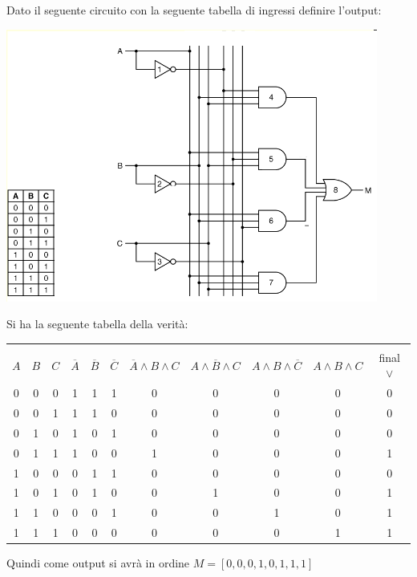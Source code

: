 \documentclass[a4paper,12pt, oneside]{book}
\begin{document}
\begin{esercizio}
Dato il seguente circuito con la seguente tabella di ingressi definire l'output:
\begin{center}
\includegraphics[scale=0.6]{img/es2.png}
\end{center}
Si ha la seguente tabella della verità:
\begin{center}
\begin{tabular}{|c|c|c|c|c|c|c|c|c|c|c|}
\hline 
& & & & & & & & & & \\
$A$ & $B$ & $C$ & $\overline{A}$ & $\overline{B}$ & $\overline{C}$ & $\overline{A}\wedge B\wedge C$  & $A\wedge \overline{B}\wedge C$ & $A\wedge B\wedge\overline{C}$ & $A\wedge B\wedge C$ & final $\vee$\\
\hline
0 & 0 & 0 & 1 & 1 & 1 & 0 & 0 & 0 & 0 & 0\\
\hline
0 & 0 & 1 & 1 & 1 & 0 & 0 & 0 & 0 & 0 & 0\\
\hline
0 & 1 & 0 & 1 & 0 & 1 & 0 & 0 & 0 & 0 & 0\\
\hline
0 & 1 & 1 & 1 & 0 & 0 & 1 & 0 & 0 & 0 & 1\\
\hline
1 & 0 & 0 & 0 & 1 & 1 & 0 & 0 & 0 & 0 & 0\\
\hline
1 & 0 & 1 & 0 & 1 & 0 & 0 & 1 & 0 & 0 & 1\\
\hline
1 & 1 & 0 & 0 & 0 & 1 & 0 & 0 & 1 & 0 & 1\\
\hline
1 & 1 & 1 & 0 & 0 & 0 & 0 & 0 & 0 & 1 & 1\\
\hline
\end{tabular}
\end{center}
Quindi come output si avrà in ordine $M=[0,0,0,1,0,1,1,1]$
\end{esercizio}
\newpage
\end{document}
